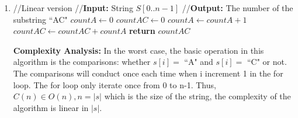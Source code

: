\documentclass[11pt]{article}
\begin{document}
\begin{enumerate}
\begin{enumerate}
\item %

\begin{algorithmic}[1]
	\State //Linear version
	\State //\textbf{Input:} String $S[0..n-1]$
	\State //\textbf{Output:} The number of the substring \textquotedblleft AC"
	\State $countA\gets 0$
	\State $countAC\gets 0$
			\State $countA\gets countA+1$
		\EndIf
			\State $countAC\gets countAC+countA$
		\EndIf
	\EndFor
	\State \textbf{return} $countAC$
\EndFunction
\end{algorithmic}
\textbf{Complexity Analysis:} In the worst case, the basic operation in this algorithm is the comparisons: whether $s[i] =$ \textquotedblleft A" and $s[i] =$ \textquotedblleft C" or not. The comparisons will conduct once each time when i increment 1 in the for loop. The for loop only iterate once from 0 to n-1. Thus, $C(n)\in O(n), n = |s|$ which is the size of the string, the complexity of the algorithm is linear in $|s|$.


\end{enumerate}
\end{enumerate}
\end{document}
